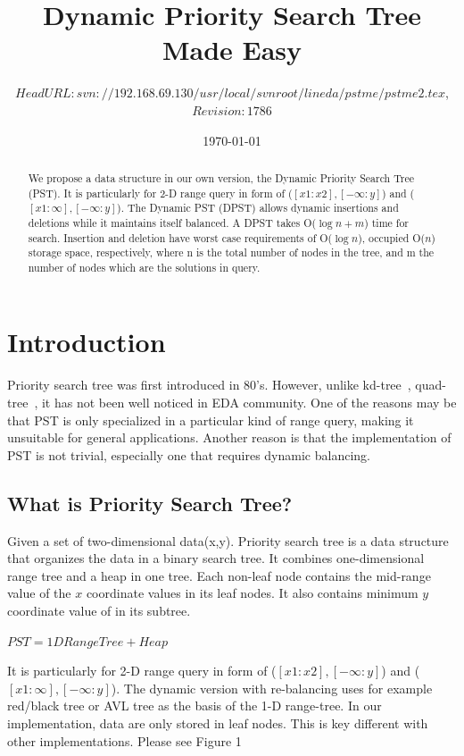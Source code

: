 \documentclass{acm_proc_article-sp}
\title{Dynamic Priority Search Tree Made Easy}
\author{$HeadURL: svn://192.168.69.130/usr/local/svnroot/lineda/pstme/pstme2.tex $,
        $Revision: 1786 $ }
\date{\today}
\begin{document}
\lstset{language=C++}
\maketitle

\begin{abstract}
We propose a data structure in our own version, the
Dynamic Priority Search Tree (PST). It is particularly for 2-D range
query in form of ($[x1:x2],[-\infty:y]$) and
($[x1:\infty],[-\infty:y]$). The Dynamic PST (DPST) allows dynamic
insertions and deletions while it maintains itself balanced. A
DPST takes O($\log n+m$) time for search. Insertion and
deletion have worst case requirements of O($\log n$), occupied
O($n$) storage space, respectively, where n is the total number of
nodes in the tree, and m the number of nodes which are the solutions
in query.
\end{abstract}


\section{Introduction}
Priority search tree was first introduced in 80's. However, unlike
kd-tree~\cite{CG_03}, quad-tree~\cite{CG_03}, it has not been well
noticed in EDA community. One of the reasons may be that PST is only
specialized in a particular kind of range query, making it
unsuitable for general applications. Another reason is that the
implementation of PST is not trivial, especially one that requires
dynamic balancing.

\subsection{What is Priority Search Tree?}
Given a set of
two-dimensional data(x,y). Priority search tree is a data structure
that organizes the data in a binary search tree. It combines one-dimensional
range tree and a heap in one tree. Each non-leaf node contains the
mid-range value of the $x$ coordinate values in its leaf nodes. It
also contains minimum $y$ coordinate value of in its subtree.

$PST = 1D Range Tree + Heap$

It is particularly for 2-D range query in form of
($[x1:x2],[-\infty:y]$) and ($[x1:\infty],[-\infty:y]$). The dynamic
version with re-balancing uses for example red/black tree or AVL
tree as the basis of the 1-D range-tree. In our implementation, data
are only stored in leaf nodes. This is key different with other
implementations. Please see Figure 1
\end{document}
